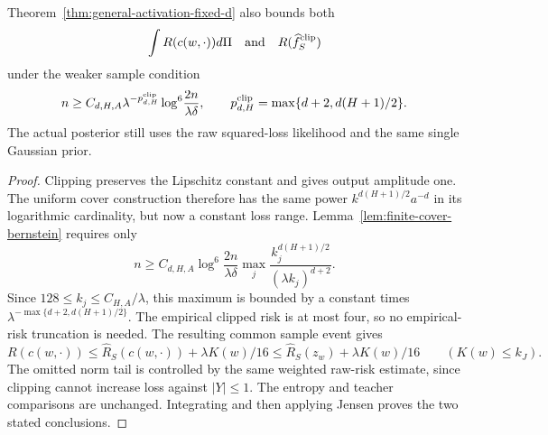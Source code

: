\begin{corollary}
\label{cor:general-activation-clipped}
Theorem~\ref{thm:general-activation-fixed-d} also bounds both
\[
 \int R(c(w,\cdot))d\Pi
 \quad\text{and}\quad R(\widehat f_S^{\rm clip})
\]
under the weaker sample condition
\[
 n\geq C_{d,H,A}\lambda^{-p_{d,H}^{\rm clip}}
          \log^6\!\frac{2n}{\lambda\delta},\qquad
 p_{d,H}^{\rm clip}=\max\{d+2,d(H+1)/2\}.
\]
The actual posterior still uses the raw squared-loss likelihood and
the same single Gaussian prior.
\end{corollary}
\begin{proof}
Clipping preserves the Lipschitz constant and gives output amplitude
one.  The uniform cover construction therefore has the same power
$k^{d(H+1)/2}a^{-d}$ in its logarithmic cardinality, but now a constant
loss range.  Lemma~\ref{lem:finite-cover-bernstein} requires only
\[
 n\geq C_{d,H,A}\log^6\!\frac{2n}{\lambda\delta}
     \max_j\frac{k_j^{d(H+1)/2}}{(\lambda k_j)^{d+2}}.
\]
Since $128\leq k_j\leq C_{H,A}/\lambda$, this maximum is bounded
by a constant times $\lambda^{-\max\{d+2,d(H+1)/2\}}$.
The empirical clipped risk is at most four, so no empirical-risk
truncation is needed.  The resulting common sample event gives
\[
 R(c(w,\cdot))\leq\widehat R_S(c(w,\cdot))+\lambda K(w)/16
             \leq\widehat R_S(z_w)+\lambda K(w)/16
 \qquad(K(w)\leq k_J).
\]
The omitted norm tail is controlled by the same weighted raw-risk
estimate, since clipping cannot increase loss against $|Y|\leq1$.
The entropy and teacher comparisons are unchanged.  Integrating and
then applying Jensen proves the two stated conclusions.
\end{proof}
